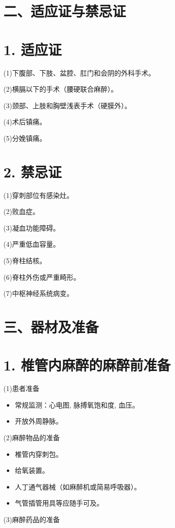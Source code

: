 \documentclass[10pt]{article}
\begin{document}
\section*{二、适应证与禁忌证}
\section*{1. 适应证}
(1)下腹部、下肢、盆腔、肛门和会阴的外科手术。

(2)横膈以下的手术（腰硬联合麻醉）。

(3)颈部、上肢和胸壁浅表手术（硬膜外）。

(4)术后镇痛。

(5)分娩镇痛。

\section*{2. 禁忌证}
(1)穿刺部位有感染灶。

(2)败血症。

(3)凝血功能障碍。

(4)严重低血容量。

(5)脊柱结核。

(6)脊柱外伤或严重畸形。

(7)中枢神经系统病变。

\section*{三、器材及准备}
\section*{1. 椎管内麻醉的麻醉前准备}
(1)患者准备

\begin{itemize}
  \item 常规监测：心电图, 脉搏氧饱和度, 血压。
  \item 开放外周静脉。
\end{itemize}

(2)麻醉物品的准备

\begin{itemize}
  \item 椎管内穿刺包。
  \item 给氧装置。
  \item 人丁通气器械（如麻醉机或简易呼吸器）。
  \item 气管插管用具等应随手可及。
\end{itemize}

(3)麻醉药品的准备
\end{document}
